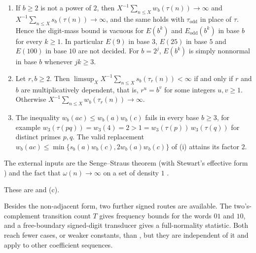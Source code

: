 \documentclass[11pt]{article}
\begin{document}
\begin{maintheorem}\label{thm:barrier-main}
\begin{enumerate}[label=\textup{(\roman*)},nosep]
\item {} If $b\ge2$ is not a power of $2$, then $X^{-1}\sum_{n\le X}w_b(\tau(n))\to\infty$ and $X^{-1}\sum_{n\le X}s_b(\tau(n))\to\infty$, and the same holds with $\tau_{\mathrm{odd}}$ in place of $\tau$. Hence the digit-mass bound is vacuous for $E(b^k)$ and $E_{\mathrm{odd}}(b^k)$ in base $b$ for every $k\ge1$. In particular $E(9)$ in base $3$, $E(25)$ in base $5$ and $E(100)$ in base $10$ are not decided. For $b=2^j$, $E(b^k)$ is simply nonnormal in base $b$ whenever $jk\ge3$.
\item {} Let $r,b\ge2$. Then $\limsup_XX^{-1}\sum_{n\le X}s_b(\tau_r(n))<\infty$ if and only if $r$ and $b$ are multiplicatively dependent, that is, $r^u=b^v$ for some integers $u,v\ge1$. Otherwise $X^{-1}\sum_{n\le X}w_b(\tau_r(n))\to\infty$.
\item {} The inequality $w_b(ac)\le w_b(a)w_b(c)$ fails in every base $b\ge3$, for example $w_3(\tau(pq))=w_3(4)=2>1=w_3(\tau(p))\,w_3(\tau(q))$ for distinct primes $p,q$. The valid replacement $w_b(ac)\le\min\{s_b(a)w_b(c),2w_b(a)w_b(c)\}$ of (i) attains its factor $2$.
\end{enumerate}
The external inputs are the Senge--Straus theorem \cite{SengeStraus73} (with Stewart's effective form \cite{Stewart80}) and the fact that $\omega(n)\to\infty$ on a set of density $1$ \cite{Tenenbaum}.
\end{maintheorem}

These are  and (c).

Besides the non-adjacent form, two further signed routes are available. The two's-complement transition count $T$ gives frequency bounds for the words $01$ and $10$, and a free-boundary signed-digit transducer gives a full-normality statistic. Both reach fewer cases, or weaker constants, than , but they are independent of it and apply to other coefficient sequences.
\end{document}
